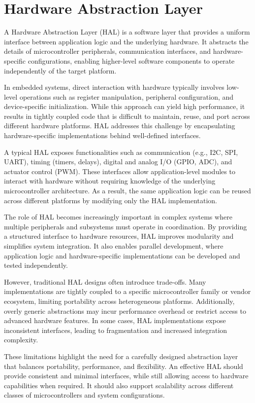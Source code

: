 \section{Hardware Abstraction Layer}
\label{sec:hal}

A Hardware Abstraction Layer (HAL) is a software layer that provides a uniform interface between application logic and the underlying hardware. It abstracts the details of microcontroller peripherals, communication interfaces, and hardware-specific configurations, enabling higher-level software components to operate independently of the target platform.

In embedded systems, direct interaction with hardware typically involves low-level operations such as register manipulation, peripheral configuration, and device-specific initialization. While this approach can yield high performance, it results in tightly coupled code that is difficult to maintain, reuse, and port across different hardware platforms. HAL addresses this challenge by encapsulating hardware-specific implementations behind well-defined interfaces.

A typical HAL exposes functionalities such as communication (e.g., I2C, SPI, UART), timing (timers, delays), digital and analog I/O (GPIO, ADC), and actuator control (PWM). These interfaces allow application-level modules to interact with hardware without requiring knowledge of the underlying microcontroller architecture. As a result, the same application logic can be reused across different platforms by modifying only the HAL implementation.

The role of HAL becomes increasingly important in complex systems where multiple peripherals and subsystems must operate in coordination. By providing a structured interface to hardware resources, HAL improves modularity and simplifies system integration. It also enables parallel development, where application logic and hardware-specific implementations can be developed and tested independently.

However, traditional HAL designs often introduce trade-offs. Many implementations are tightly coupled to a specific microcontroller family or vendor ecosystem, limiting portability across heterogeneous platforms. Additionally, overly generic abstractions may incur performance overhead or restrict access to advanced hardware features. In some cases, HAL implementations expose inconsistent interfaces, leading to fragmentation and increased integration complexity.

These limitations highlight the need for a carefully designed abstraction layer that balances portability, performance, and flexibility. An effective HAL should provide consistent and minimal interfaces, while still allowing access to hardware capabilities when required. It should also support scalability across different classes of microcontrollers and system configurations.

